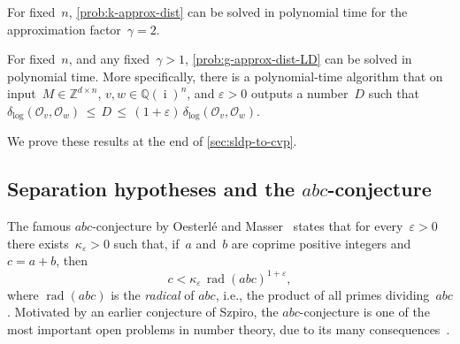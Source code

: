 \documentclass[a4paper,USenglish,cleveref,numberwithinsect]{lipics-v2021}
\DeclareMathOperator{\rad}{rad}
\DeclareMathOperator{\ii}{i}
\newcommand{\distLD}{\delta_{\log}}
\newcommand{\QQ}{\mathbb{Q}}
\newcommand{\ZZ}{\mathbb{Z}}
\newcommand{\OO}{\ensuremath{\mathcal{O}}}
\newcommand{\eps}{\varepsilon}
\newcommand{\abc}{\texorpdfstring{$abc$}{abc}}
\numberwithin{equation}{section}
\begin{document}
\begin{theorem}\label{thm:compact-fixed-dimension}
For fixed~$n$, \cref{prob:k-approx-dist} can be solved in polynomial time
for the approximation factor~$\gamma = 2$.
\end{theorem}

\begin{theorem}\label{thm:fixed-dimension}
For fixed~$n$,
and any fixed~$\gamma>1$,
\cref{prob:g-approx-dist-LD} can be solved in polynomial time.
More specifically, there is a polynomial-time algorithm that on
input~$M\in\ZZ^{d\times n}$, $v,w \in \QQ(\ii)^n$, and $\eps>0$ outputs a number~$D$
such that~$\distLD(\OO_v,\OO_w) \,\leq \, D \, \leq\, (1+\varepsilon)\, \distLD(\OO_v,\OO_w)$.
\end{theorem}

We prove these results at the end of \cref{sec:sldp-to-cvp}.

\subsection{Separation hypotheses and the \abc-conjecture}\label{subsec:intro-abc}
The famous \abc-conjecture by Oesterl\'{e} and Masser~\cite{oesterle} states that for every~$\varepsilon>0$
there exists~$\kappa_\varepsilon>0$ such that, if~$a$ and~$b$ are coprime positive integers and $c=a+b$, then
\[
c < \kappa_\varepsilon \, \rad(abc)^{1+\varepsilon},
\] where $\rad(abc)$ is the \textit{radical} of $abc$, i.e., the product of all primes dividing~$abc$.
Motivated by an earlier conjecture of Szpiro, the \abc-conjecture is one of the most important open problems
in number theory,
due to its many consequences~\cite{granvilletucker,abc-consequences}.
\end{document}

